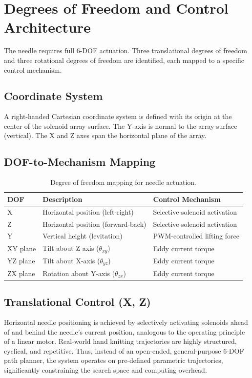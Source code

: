 \documentclass[10pt]{article}
\begin{document}
\section{Degrees of Freedom and Control Architecture}
The needle requires full 6-DOF actuation. Three translational degrees of freedom and three rotational degrees of freedom are identified, each mapped to a specific control mechanism.

\subsection{Coordinate System}
A right-handed Cartesian coordinate system is defined with its origin at the center of the solenoid array surface. The Y-axis is normal to the array surface (vertical). The X and Z axes span the horizontal plane of the array.

\subsection{DOF-to-Mechanism Mapping}
\begin{table}[htbp]
\centering
\begin{tabularx}{\linewidth}{l X X}
\toprule
DOF & Description & Control Mechanism \\
\midrule
X & Horizontal position (left-right) & Selective solenoid activation \\
Z & Horizontal position (forward-back) & Selective solenoid activation \\
Y & Vertical height (levitation) & PWM-controlled lifting force \\
XY plane & Tilt about Z-axis ($\theta_{xy}$) & Eddy current torque \\
YZ plane & Tilt about X-axis ($\theta_{yz}$) & Eddy current torque \\
ZX plane & Rotation about Y-axis ($\theta_{zx}$) & Eddy current torque \\
\bottomrule
\end{tabularx}
\caption{Degree of freedom mapping for needle actuation.}
\end{table}

\subsection{Translational Control (X, Z)}
Horizontal needle positioning is achieved by selectively activating solenoids ahead of and behind the needle's current position, analogous to the operating principle of a linear motor. Real-world hand knitting trajectories are highly structured, cyclical, and repetitive. Thus, instead of an open-ended, general-purpose 6-DOF path planner, the system operates on pre-defined parametric trajectories, significantly constraining the search space and computing overhead.
\end{document}
